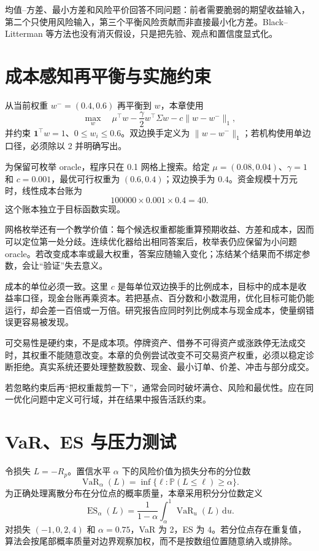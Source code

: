 均值--方差、最小方差和风险平价回答不同问题：前者需要脆弱的期望收益输入，第二个只使用风险输入，第三个平衡风险贡献而非直接最小化方差。Black--Litterman 等方法也没有消灭假设，只是把先验、观点和置信度显式化。

\section{成本感知再平衡与实施约束}

从当前权重 $w^-=(0.4,0.6)$ 再平衡到 $w$，本章使用
\[
 \max_w\quad \mu^\top w-\frac\gamma2w^\top\Sigma w
 -c\lVert w-w^-\rVert_1,
\]
并约束 $\mathbf1^\top w=1$、$0\le w_i\le0.6$。双边换手定义为 $\lVert w-w^-\rVert_1$；若机构使用单边口径，必须除以 2 并明确写出。

为保留可枚举 oracle，程序只在 0.1 网格上搜索。给定 $\mu=(0.08,0.04)$、$\gamma=1$ 和 $c=0.001$，最优可行权重为 $(0.6,0.4)$；双边换手为 $0.4$。资金规模十万元时，线性成本台账为
\[
 100000\times0.001\times0.4=40.
\]
这个账本独立于目标函数实现。

网格枚举还有一个教学价值：每个候选权重都能重算预期收益、方差和成本，因而可以定位第一处分歧。连续优化器给出相同答案后，枚举表仍应保留为小问题 oracle。若改变成本率或最大权重，答案应随输入变化；冻结某个结果而不绑定参数，会让“验证”失去意义。

成本的单位必须一致。这里 $c$ 是每单位双边换手的比例成本，目标中的成本是收益率口径，现金台账再乘资本。若把基点、百分数和小数混用，优化目标可能仍能运行，却会差一百倍或一万倍。研究报告应同时列比例成本与现金成本，使量纲错误更容易被发现。

可交易性是硬约束，不是成本项。停牌资产、借券不可得资产或涨跌停无法成交时，其权重不能随意改变。本章的负例尝试改变不可交易资产权重，必须以稳定诊断拒绝。真实系统还要处理整数股数、现金、最小订单、价差、冲击与部分成交。

\begin{note}[研究解释]
若忽略约束后再“把权重裁剪一下”，通常会同时破坏满仓、风险和最优性。应在同一优化问题中定义可行域，并在结果中报告活跃约束。
\end{note}

\section{VaR、ES 与压力测试}

令损失 $L=-R_p$。置信水平 $\alpha$ 下的风险价值为损失分布的分位数
\[
 \operatorname{VaR}_\alpha(L)=\inf\{\ell:\mathbb P(L\le\ell)\ge\alpha\}.
\]
为正确处理离散分布在分位点的概率质量，本章采用积分分位数定义
\[
 \operatorname{ES}_\alpha(L)=
 \frac{1}{1-\alpha}\int_\alpha^1\operatorname{VaR}_u(L)\,\mathrm du.
\]
对损失 $(-1,0,2,4)$ 和 $\alpha=0.75$，VaR 为 2，ES 为 4。若分位点存在重复值，算法会按尾部概率质量对边界观察加权，而不是按数组位置随意纳入或排除。

